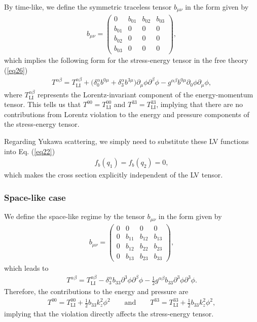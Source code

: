 \documentclass[11pt,showpacs,preprintnumbers,amsmath,amssymb,prd,nofootinbib,superscriptaddress]{revtex4-2}
\begin{document}
By time-like, we define the symmetric traceless tensor $b_{\mu \nu}$ in the form given by
\begin{eqnarray}
   b_{\mu\nu}= \begin{pmatrix}
         0 & b_{01} & b_{02} & b_{03} \\ b_{01} &0&0&0\\
          b_{02} &0&0&0\\
          b_{03} &0&0&0
    \end{pmatrix},
\end{eqnarray}
which implies the following form for the stress-energy tensor in the free theory (\ref{eq26})
\begin{eqnarray}
    T^{\alpha\beta}=T^{\alpha\beta}_{\text{LI}}+\biggl(\delta^{\alpha}_0b^{0\mu}+\delta^{\alpha}_3b^{3\mu}\biggr)\partial_\mu\phi\partial^\beta\phi-g^{\alpha\beta}b^{0\mu}\partial_0\phi\partial_\mu\phi,
\end{eqnarray}
where $T^{\alpha\beta}_{\text{LI}}$ represents the Lorentz-invariant component of the energy-momentum tensor. This tells us that $T^{00} = T^{00}_{\text{LI}}$ and $T^{33} = T^{33}_{\text{LI}}$, implying that there are no contributions from Lorentz violation to the energy and pressure components of the stress-energy tensor.

Regarding Yukawa scattering, we simply need to substitute these { LV functions into Eq. (\ref{eq22})
\begin{eqnarray}
    f_b(q_1)=f_b(q_2)=0,
\end{eqnarray}
which makes the cross section explicitly independent of the LV tensor.}


\subsubsection{Space-like case}

We define the space-like regime by the tensor $b_{\mu \nu}$ in the form given by
\begin{eqnarray}
 b_{\mu\nu}=   \begin{pmatrix}
          0&0&0&0 \\ 
          0&b_{11}&b_{12}&b_{13}\\
          0&b_{12}&b_{22}&b_{23}\\
          0&b_{13}&b_{23}&b_{33}
    \end{pmatrix},
\end{eqnarray}
which leads to
\begin{eqnarray}
T^{\alpha\beta}=T^{\alpha\beta}_{\text{LI}}-\delta^\alpha_3b_{33}\partial^3\phi\partial^\beta\phi-\frac{1}{2}g^{\alpha\beta}b_{33}\partial^3\phi\partial^3\phi.
\end{eqnarray}
Therefore, the contributions to the energy and pressure are
\begin{eqnarray}
T^{00}=T^{00}_{\text{LI}}+\frac{1}{2}b_{33}k_z^2\phi^2\quad\quad\text{and}\quad\quad T^{33}=T^{33}_{\text{LI}}+\frac{1}{2}b_{33}k_z^2\phi^2,
\end{eqnarray}
implying that the violation directly affects the stress-energy tensor.
\end{document}
